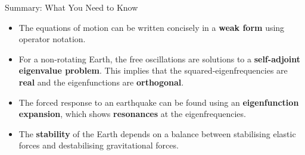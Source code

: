 \documentclass{beamer}
\begin{document}

\begin{frame}{Summary: What You Need to Know}
    \begin{itemize}
        \item The equations of motion can be written concisely in a \textbf{weak form} using operator notation.
        \pause
        \item For a non-rotating Earth, the free oscillations are solutions to a \textbf{self-adjoint eigenvalue problem}. This implies that the squared-eigenfrequencies are \textbf{real} and the eigenfunctions are \textbf{orthogonal}.
        \pause
        \item The forced response to an earthquake can be found using an \textbf{eigenfunction expansion}, which shows \textbf{resonances} at the eigenfrequencies.
        \pause
        \item The \textbf{stability} of the Earth depends on a balance between stabilising elastic forces and destabilising gravitational forces.
    \end{itemize}
\end{frame}
\end{document}
